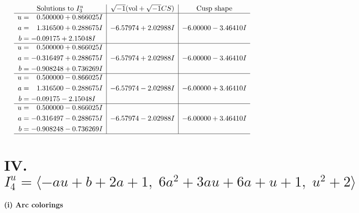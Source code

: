 \documentclass[1p]{elsarticle_modified}
\theoremstyle{definition}
\newcommand{\I}{\sqrt{-1}}
\begin{document}
$$\begin{array}{c|c|c}  
\text{Solutions to }I^u_{3}& \I (\text{vol} + \sqrt{-1}CS) & \text{Cusp shape}\\
 \hline 
\begin{aligned}
u &= \phantom{-}0.500000 + 0.866025 I \\
a &= \phantom{-}1.316500 + 0.288675 I \\
b &= -0.09175 + 2.15048 I\end{aligned}
 & -6.57974 + 2.02988 I & -6.00000 - 3.46410 I \\ \hline\begin{aligned}
u &= \phantom{-}0.500000 + 0.866025 I \\
a &= -0.316497 + 0.288675 I \\
b &= -0.908248 + 0.736269 I\end{aligned}
 & -6.57974 + 2.02988 I & -6.00000 - 3.46410 I \\ \hline\begin{aligned}
u &= \phantom{-}0.500000 - 0.866025 I \\
a &= \phantom{-}1.316500 - 0.288675 I \\
b &= -0.09175 - 2.15048 I\end{aligned}
 & -6.57974 - 2.02988 I & -6.00000 + 3.46410 I \\ \hline\begin{aligned}
u &= \phantom{-}0.500000 - 0.866025 I \\
a &= -0.316497 - 0.288675 I \\
b &= -0.908248 - 0.736269 I\end{aligned}
 & -6.57974 - 2.02988 I & -6.00000 + 3.46410 I\\
 \hline 
 \end{array}$$\newpage\newpage\renewcommand{\arraystretch}{1}
\centering \section*{IV. $I^u_{4}= \langle - a u+b+2 a+1,\;6 a^2+3 a u+6 a+u+1,\;u^2+2 \rangle$}
\flushleft \textbf{(i) Arc colorings}\\
\end{document}
